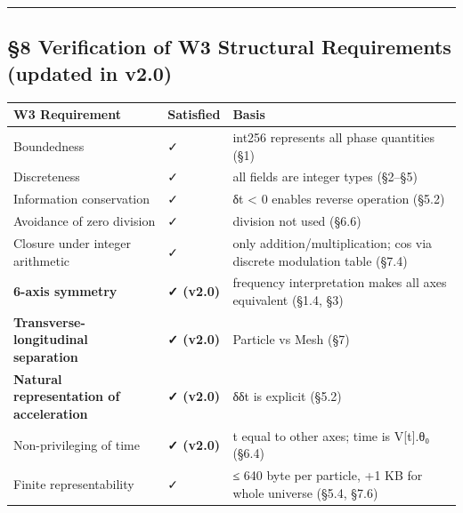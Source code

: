 \documentclass[a4paper,11pt]{article}
\newcounter{none}
\begin{document}
\begin{center}\rule{0.5\linewidth}{0.5pt}\end{center}

\subsection{§8 Verification of W3 Structural Requirements (updated in
v2.0)}\label{verification-of-w3-structural-requirements-updated-in-v2.0}

{\def\LTcaptype{none} %
\begin{longtable}[]{@{}
  >{\raggedright\arraybackslash}p{}
  >{\raggedright\arraybackslash}p{}
  >{\raggedright\arraybackslash}p{}@{}}
\toprule\noalign{}
\begin{minipage}[b]{\linewidth}\raggedright
W3 Requirement
\end{minipage} & \begin{minipage}[b]{\linewidth}\raggedright
Satisfied
\end{minipage} & \begin{minipage}[b]{\linewidth}\raggedright
Basis
\end{minipage} \\
\midrule\noalign{}
\endhead
\bottomrule\noalign{}
\endlastfoot
Boundedness & ✓ & int256 represents all phase quantities (§1) \\
Discreteness & ✓ & all fields are integer types (§2--§5) \\
Information conservation & ✓ & δt \textless{} 0 enables reverse
operation (§5.2) \\
Avoidance of zero division & ✓ & division not used (§6.6) \\
Closure under integer arithmetic & ✓ & only addition/multiplication; cos
via discrete modulation table (§7.4) \\
\textbf{6-axis symmetry} & \textbf{✓ (v2.0)} & frequency interpretation
makes all axes equivalent (§1.4, §3) \\
\textbf{Transverse-longitudinal separation} & \textbf{✓ (v2.0)} &
Particle vs Mesh (§7) \\
\textbf{Natural representation of acceleration} & \textbf{✓ (v2.0)} &
δδt is explicit (§5.2) \\
Non-privileging of time & \textbf{✓ (v2.0)} & t equal to other axes;
time is V{[}t{]}.θ₀ (§6.4) \\
Finite representability & ✓ & ≤ 640 byte per particle, +1 KB for whole
universe (§5.4, §7.6) \\
\end{longtable}
}
\end{document}
